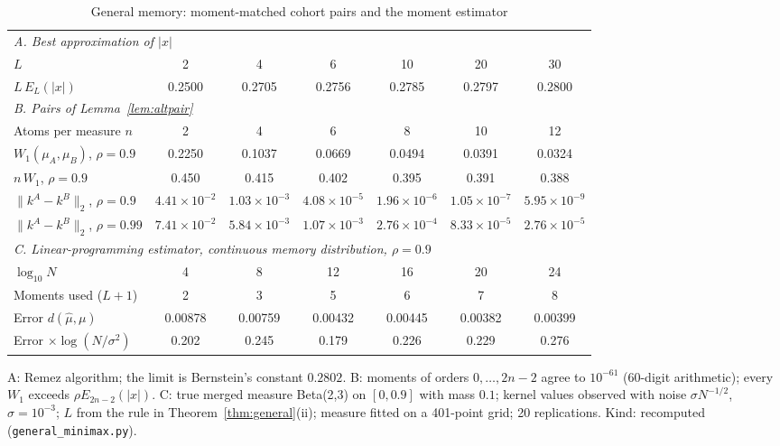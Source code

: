 \documentclass[12pt]{article}
\theoremstyle{definition}
\theoremstyle{remark}
\begin{document}
\begin{table}[t]\centering\small
\begin{threeparttable}
\caption{General memory: moment-matched cohort pairs and the moment estimator}\label{tab:general}
\setlength{\tabcolsep}{3.5pt}
\begin{tabular}{lcccccc}
\toprule
\multicolumn{7}{l}{\emph{A. Best approximation of $|x|$}}\\
$L$ & 2 & 4 & 6 & 10 & 20 & 30\\
$L\,E_L(|x|)$ & 0.2500 & 0.2705 & 0.2756 & 0.2785 & 0.2797 & 0.2800\\
\midrule
\multicolumn{7}{l}{\emph{B. Pairs of Lemma~\ref{lem:altpair}}}\\
Atoms per measure $n$ & 2 & 4 & 6 & 8 & 10 & 12\\
$W_1(\mu_A,\mu_B)$, $\rho=0.9$ & 0.2250 & 0.1037 & 0.0669 & 0.0494 & 0.0391 & 0.0324\\
$n\,W_1$, $\rho=0.9$ & 0.450 & 0.415 & 0.402 & 0.395 & 0.391 & 0.388\\
$\|k^A-k^B\|_2$, $\rho=0.9$ & $4.41\times10^{-2}$ & $1.03\times10^{-3}$ & $4.08\times10^{-5}$ & $1.96\times10^{-6}$ & $1.05\times10^{-7}$ & $5.95\times10^{-9}$\\
$\|k^A-k^B\|_2$, $\rho=0.99$ & $7.41\times10^{-2}$ & $5.84\times10^{-3}$ & $1.07\times10^{-3}$ & $2.76\times10^{-4}$ & $8.33\times10^{-5}$ & $2.76\times10^{-5}$\\
\midrule
\multicolumn{7}{l}{\emph{C. Linear-programming estimator, continuous memory distribution, $\rho=0.9$}}\\
$\log_{10}N$ & 4 & 8 & 12 & 16 & 20 & 24\\
Moments used ($L+1$) & 2 & 3 & 5 & 6 & 7 & 8\\
Error $d(\hat\mu,\mu)$ & 0.00878 & 0.00759 & 0.00432 & 0.00445 & 0.00382 & 0.00399\\
Error $\times\log(N/\sigma^2)$ & 0.202 & 0.245 & 0.179 & 0.226 & 0.229 & 0.276\\
\bottomrule
\end{tabular}
\begin{tablenotes}\footnotesize\item A: Remez algorithm; the limit is Bernstein's constant $0.2802$. B: moments of orders $0,\ldots,2n-2$ agree to $10^{-61}$ (60-digit arithmetic); every $W_1$ exceeds $\rho E_{2n-2}(|x|)$. C: true merged measure Beta(2,3) on $[0,0.9]$ with mass $0.1$; kernel values observed with noise $\sigma N^{-1/2}$, $\sigma=10^{-3}$; $L$ from the rule in Theorem~\ref{thm:general}(ii); measure fitted on a 401-point grid; 20 replications. Kind: recomputed (\texttt{general\_minimax.py}).\end{tablenotes}
\end{threeparttable}
\end{table}
\end{document}

